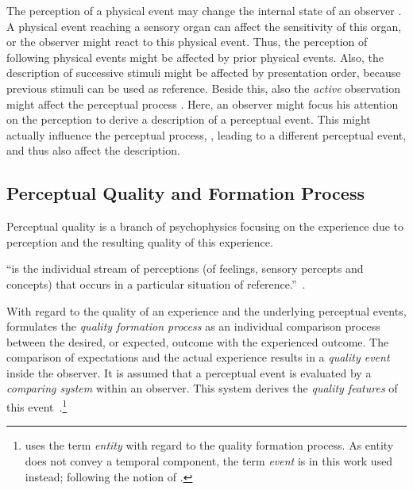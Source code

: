 The perception of a physical event may change the internal state of an observer \citep{raake_quality_2014}.
A physical event reaching a sensory organ can affect the sensitivity of this organ, or the observer might react to this physical event.
Thus, the perception of following physical events might be affected by prior physical events.
Also, the description of successive stimuli might be affected by presentation order, because previous stimuli can be used as reference.
Beside this, also the \emph{active} observation might affect the perceptual process \citep[][p.~30]{raake_quality_2014}.
Here, an observer might focus his attention on the perception to derive a description of a perceptual event.
This might actually influence the perceptual process, \ie, leading to a different perceptual event, and thus also affect the description.


\subsection{Perceptual Quality and Formation Process}\label{related:perceivedQuality}
Perceptual quality is a branch of psychophysics focusing on the experience due to perception and the resulting quality of this experience.
\begin{definition}[Experiencing]
``is the individual stream of perceptions (of feelings, sensory percepts and concepts) that occurs in a particular situation of reference.''~\citep[p.~13]{raake_quality_2014}.
\end{definition}

With regard to the quality of an experience and the underlying perceptual events, \citet{jekosch_voice_2005} formulates the \emph{quality formation process} as an individual comparison process between the desired, or expected, outcome with the experienced outcome.
The comparison of expectations and the actual experience results in a \emph{quality event} inside the observer.
It is assumed that a perceptual event is evaluated by a \emph{comparing system} within an observer.
This system  derives the \emph{quality features} of this event~\citep[\cf,][p.~17]{jekosch_voice_2005}.\footnote{\citet{jekosch_voice_2005} uses the term \emph{entity} with regard to the quality formation process.
As entity does not convey a temporal component, the term \emph{event} is in this work used instead; following the notion of \citet{blauert_spatial_1996}.}

